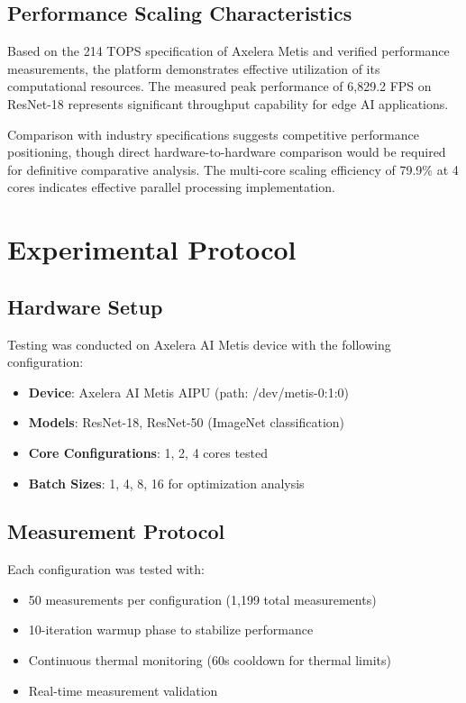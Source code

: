 \documentclass[journal]{IEEEtran}
\begin{document}
\subsection{Performance Scaling Characteristics}

Based on the 214 TOPS specification of Axelera Metis and verified performance measurements, the platform demonstrates effective utilization of its computational resources. The measured peak performance of 6,829.2 FPS on ResNet-18 represents significant throughput capability for edge AI applications.

Comparison with industry specifications suggests competitive performance positioning, though direct hardware-to-hardware comparison would be required for definitive comparative analysis. The multi-core scaling efficiency of 79.9\% at 4 cores indicates effective parallel processing implementation.

\section{Experimental Protocol}

\subsection{Hardware Setup}

Testing was conducted on Axelera AI Metis device with the following configuration:
\begin{itemize}
    \item \textbf{Device}: Axelera AI Metis AIPU (path: /dev/metis-0:1:0)
    \item \textbf{Models}: ResNet-18, ResNet-50 (ImageNet classification)
    \item \textbf{Core Configurations}: 1, 2, 4 cores tested
    \item \textbf{Batch Sizes}: 1, 4, 8, 16 for optimization analysis
\end{itemize}

\subsection{Measurement Protocol}

Each configuration was tested with:
\begin{itemize}
    \item 50 measurements per configuration (1,199 total measurements)
    \item 10-iteration warmup phase to stabilize performance
    \item Continuous thermal monitoring (60s cooldown for thermal limits)
    \item Real-time measurement validation
\end{itemize}
\end{document}
